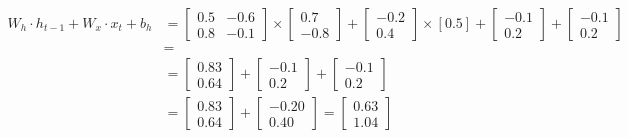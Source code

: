 \documentclass[12pt, xcolor=dvipsnames,svgnames,x11names]{article}
\begin{document}
\begin{equation}
    \begin{aligned}
        W_h \cdot h_{t-1} + W_x \cdot x_t + b_h & = \begin{bmatrix}
            0.5 & -0.6 \\ 0.8 & -0.1
        \end{bmatrix} \times \begin{bmatrix} 0.7 \\ -0.8 \end{bmatrix} + \begin{bmatrix} -0.2 \\ 0.4 \end{bmatrix}\times [0.5]  + \begin{bmatrix} -0.1 \\ 0.2 \end{bmatrix} + \begin{bmatrix} -0.1 \\ 0.2 \end{bmatrix}\\
        & = \\
        & =\begin{bmatrix}
            0.83 \\ 0.64  
        \end{bmatrix}+ \begin{bmatrix}
                -0.1\\0.2
            \end{bmatrix} + \begin{bmatrix} -0.1 \\ 0.2 \end{bmatrix}\\
            & = \begin{bmatrix}
            0.83 \\ 0.64  
        \end{bmatrix} + \begin{bmatrix}
            -0.20 \\ 0.40
        \end{bmatrix} = \begin{bmatrix}
            0.63 \\ 1.04  
        \end{bmatrix}
    \end{aligned}
\end{equation}
\end{document}
